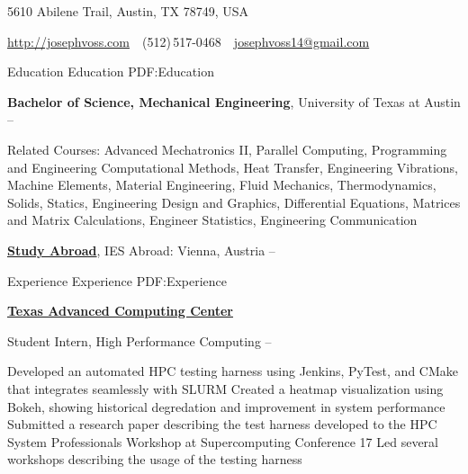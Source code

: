 \documentclass[letterpaper,MMMyyyy,nonstopmode]{simpleresumecv}
\newcommand{\CVAuthor}{Joseph Voss}
\newcommand{\CVWebpage}{http://josephvoss.com}
\begin{document}

\Title{\CVAuthor}

\begin{SubTitle}
{5610 Abilene Trail, Austin, TX 78749, USA}
\par
\href{\CVWebpage}
{\url{\CVWebpage}}
\,\SubBulletSymbol\,
(512)\,517-0468
\,\SubBulletSymbol\,
\href{mailto:josephvoss14@gmail.com}
{josephvoss14@gmail.com}

\end{SubTitle}

\begin{Body}


\Section
{Education}
{Education}
{PDF:Education}

\Entry
{\textbf{Bachelor of Science, Mechanical Engineering}},
University of Texas at Austin
\hfill
{} --

\Gap
\begin{Detail}
Related Courses:
Advanced Mechatronics II, Parallel Computing, Programming and Engineering Computational Methods, Heat Transfer, Engineering Vibrations, Machine Elements, Material Engineering, Fluid Mechanics, Thermodynamics, Solids, Statics, Engineering Design and Graphics, Differential Equations, Matrices and Matrix Calculations, Engineer Statistics, Engineering Communication
\end{Detail}

\BigGap
\Entry
\href{http://sites.utexas.edu/studyabroad/self-discovery-in-austria/}
{\textbf{Study Abroad}},
IES Abroad: Vienna, Austria
\hfill
{} -- 


\Section
{Experience}
{Experience}
{PDF:Experience}

\Entry
\href{http://tacc.utexas.edu}
{\textbf{Texas Advanced Computing Center}}

\Gap
\BulletItem
Student Intern, High Performance Computing
\hfill
{} --
\begin{Detail}
\SubBulletItem
Developed an automated HPC testing harness using Jenkins, PyTest, and CMake \newline
that integrates seamlessly with SLURM
\SubBulletItem
Created a heatmap visualization using Bokeh, showing historical degredation and \newline 
improvement in system performance
\SubBulletItem
Submitted a research paper describing the test harness developed 
\newline to the HPC System Professionals Workshop at Supercomputing Conference 17
\SubBulletItem
Led several workshops describing the usage of the testing harness
\end{Detail}


\end{Body}
\end{document}
